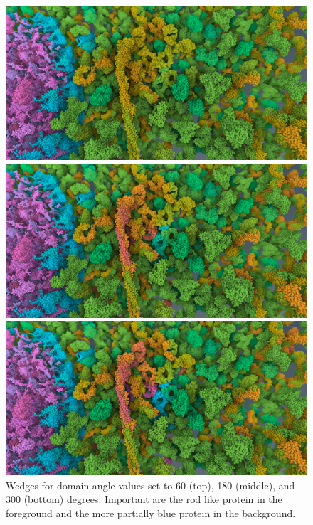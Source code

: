 \documentclass{article}
\begin{document}
	\begin{figure}[t]
		\includegraphics[width=0.95\linewidth,keepaspectratio]{supplementaryMaterial/domain60} 
		
		\vspace{0.1cm}
		
		\includegraphics[width=0.95\linewidth,keepaspectratio]{supplementaryMaterial/domain180} 
		
		\vspace{0.1cm}
		
		\includegraphics[width=0.95\linewidth,keepaspectratio]{supplementaryMaterial/domain300} 
		\caption{Wedges for domain angle values set to 60 (top), 180 (middle), and 300 (bottom) degrees. Important are the rod like protein in the foreground and the more partially blue protein in the background.}
	\end{figure}
	
\end{document}
